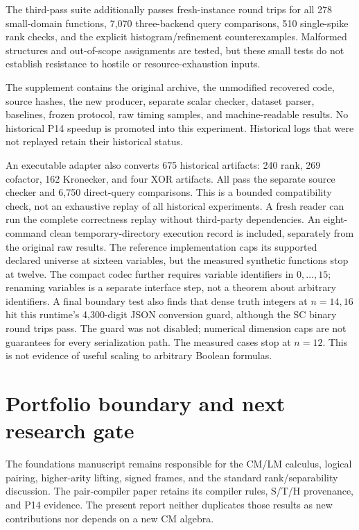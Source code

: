 \documentclass[11pt]{article}
\theoremstyle{definition}\newtheorem{definition}[theorem]{Definition}
\theoremstyle{remark}\newtheorem{remark}[theorem]{Remark}
\begin{document}
The third-pass suite additionally passes fresh-instance round trips for all 278 small-domain functions, 7,070 three-backend query comparisons, 510 single-spike rank checks, and the explicit histogram/refinement counterexamples. Malformed structures and out-of-scope assignments are tested, but these small tests do not establish resistance to hostile or resource-exhaustion inputs.

The supplement contains the original archive, the unmodified recovered code, source hashes, the new producer, separate scalar checker, dataset parser, baselines, frozen protocol, raw timing samples, and machine-readable results. No historical P14 speedup is promoted into this experiment. Historical logs that were not replayed retain their historical status.

An executable adapter also converts 675 historical artifacts: 240 rank, 269 cofactor, 162 Kronecker, and four XOR artifacts. All pass the separate source checker and 6,750 direct-query comparisons. This is a bounded compatibility check, not an exhaustive replay of all historical experiments. A fresh reader can run the complete correctness replay without third-party dependencies. An eight-command clean temporary-directory execution record is included, separately from the original raw results. The reference implementation caps its supported declared universe at sixteen variables, but the measured synthetic functions stop at twelve. The compact codec further requires variable identifiers in $0,\ldots,15$; renaming variables is a separate interface step, not a theorem about arbitrary identifiers. A final boundary test also finds that dense truth integers at $n=14,16$ hit this runtime's 4,300-digit JSON conversion guard, although the SC binary round trips pass. The guard was not disabled; numerical dimension caps are not guarantees for every serialization path. The measured cases stop at $n=12$. This is not evidence of useful scaling to arbitrary Boolean formulas.

\section{Portfolio boundary and next research gate}
The foundations manuscript remains responsible for the CM/LM calculus, logical pairing, higher-arity lifting, signed frames, and the standard rank/separability discussion\cite{foundations}. The pair-compiler paper retains its compiler rules, S/T/H provenance, and P14 evidence. The present report neither duplicates those results as new contributions nor depends on a new CM algebra.
\end{document}
